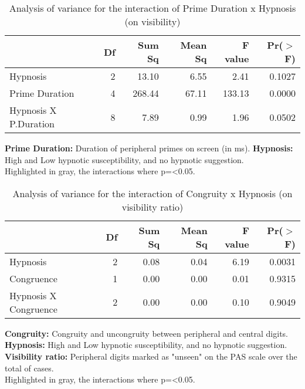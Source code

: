 \documentclass{article}
\begin{document}


\begin{table}
\caption{Analysis of variance for the interaction of Prime Duration x  Hypnosis (on visibility)}
\centering
\begin{tabular}{lrrrrr}
  \hline
 & Df & Sum Sq & Mean Sq & F value & Pr($>$F) \\ 
  \hline
Hypnosis       & 2 & 13.10 & 6.55 & 2.41 & 0.1027 \\
  \hline
  \rowcolor{Gray}
  Prime Duration     & 4 & 268.44 & 67.11 & 133.13 & 0.0000 \\
  \hline
  \rowcolor{Gray}  
  Hypnosis X P.Duration & 8 & 7.89 & 0.99 & 1.96 & 0.0502 \\ 
   \hline
\end{tabular}
\end{table}
\textbf{Prime Duration:} Duration of peripheral primes on screen (in ms). \textbf{Hypnosis:} High and Low hypnotic susceptibility, and no hypnotic suggestion.\\ Highlighted in gray, the interactions where p=<0.05.

\begin{table}
\caption{Analysis of variance for the interaction of Congruity x  Hypnosis (on visibility ratio)}
\centering
\begin{tabular}{lrrrrr}
  \hline
 & Df & Sum Sq & Mean Sq & F value & Pr($>$F) \\ 
  \hline
  \rowcolor{Gray} 
Hypnosis & 2 & 0.08 & 0.04 & 6.19 & 0.0031 \\ 
Congruence & 1 & 0.00 & 0.00 & 0.01 & 0.9315 \\ 
  Hypnosis X Congruence & 2 & 0.00 & 0.00 & 0.10 & 0.9049 \\ 
   \hline
\end{tabular}
\end{table}
\textbf{Congruity:} Congruity and uncongruity between peripheral and central digits. \textbf{Hypnosis:} High and Low hypnotic susceptibility, and no hypnotic suggestion. \textbf{Visibility ratio:} Peripheral digits marked as "unseen" on the PAS scale over the total of cases.\\ Highlighted in gray, the interactions where p=<0.05.
\end{document}
